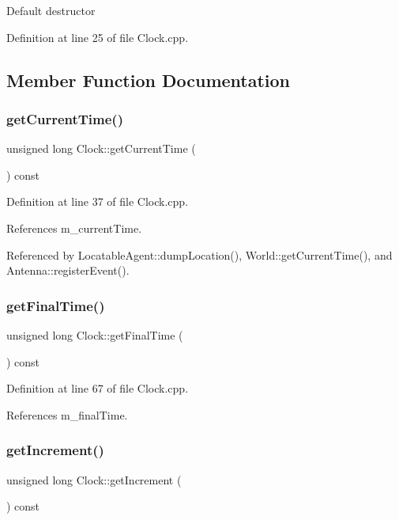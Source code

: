 Default destructor 

Definition at line 25 of file Clock.\+cpp.



\subsection{Member Function Documentation}
\mbox{\label{class_clock_a17b19c062d1f0344f37b57cc2dfdaa14}} 
\subsubsection{getCurrentTime()}
{\footnotesize\ttfamily unsigned long Clock\+::get\+Current\+Time (\begin{DoxyParamCaption}{ }\end{DoxyParamCaption}) const}



Definition at line 37 of file Clock.\+cpp.



References m\+\_\+current\+Time.



Referenced by Locatable\+Agent\+::dump\+Location(), World\+::get\+Current\+Time(), and Antenna\+::register\+Event().

\mbox{\label{class_clock_a0b9ef0b9272d6555bb0fdca4978c705d}} 
\subsubsection{getFinalTime()}
{\footnotesize\ttfamily unsigned long Clock\+::get\+Final\+Time (\begin{DoxyParamCaption}{ }\end{DoxyParamCaption}) const}



Definition at line 67 of file Clock.\+cpp.



References m\+\_\+final\+Time.

\mbox{\label{class_clock_a804626d5455f4a2a73321f84ed7a9819}} 
\subsubsection{getIncrement()}
{\footnotesize\ttfamily unsigned long Clock\+::get\+Increment (\begin{DoxyParamCaption}{ }\end{DoxyParamCaption}) const}



